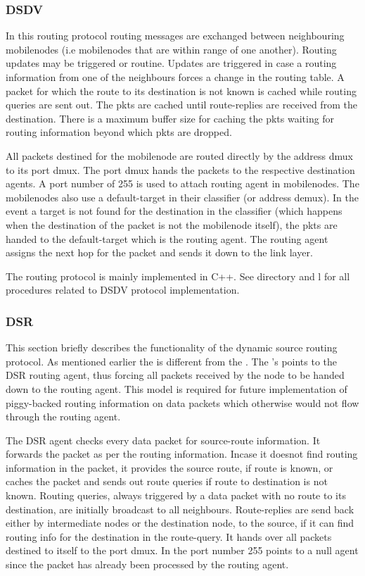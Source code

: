 \subsubsection{DSDV}
\label{sec:dsdv}

In this routing protocol routing messages are exchanged between neighbouring mobilenodes (i.e mobilenodes that are within range of one another). Routing updates may be triggered or routine. Updates are triggered in case a routing information from one of the neighbours forces a change in the routing table.
A packet for which the route to its destination is not known is cached while routing queries are sent out. The pkts are cached until route-replies are received from the destination. There is a maximum buffer size for caching the pkts waiting for routing information beyond which pkts are dropped.

All packets destined for the mobilenode are routed directly by the address dmux to its port dmux. The port dmux hands the packets to the respective destination agents. A port number of 255 is used to attach routing agent in mobilenodes. The mobilenodes also use a default-target in their classifier (or address demux). In the event a target is not found for the destination in the classifier (which happens when the destination of the packet is not the mobilenode itself), the pkts are handed to the default-target which is the routing agent. The routing agent assigns the next hop for the packet and sends it down to the link layer.

The routing protocol is mainly implemented in C++. See  directory and l for all procedures related to DSDV protocol implementation.


\subsubsection{DSR}
\label{sec:dsr}

This section briefly describes the functionality of the dynamic source routing protocol. As mentioned earlier the  is different from the .  The 's  points to the DSR routing agent, thus forcing all packets received by the node to be handed down to the routing agent. This model is required for future implementation of piggy-backed routing information on data packets which otherwise would not flow through the routing agent.

The DSR agent checks every data packet for source-route information. It forwards the packet as per the routing information. Incase it doesnot find routing information in the packet, it provides the source route, if route is known, or caches the packet and sends out route queries if route to destination is not known. Routing queries, always triggered by a data packet with no route to its destination, are initially broadcast to all neighbours. Route-replies are send back either by intermediate nodes or the destination node, to the source, if it can find routing info for the destination in the route-query.  It hands over all packets destined to itself to the port dmux.
In  the port number 255 points to a null agent since the packet has already been processed by the routing agent.

